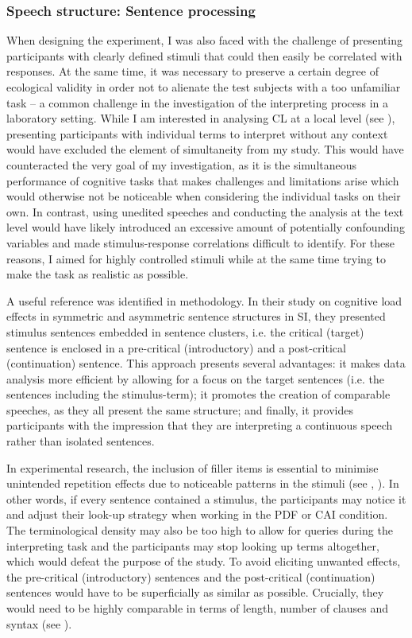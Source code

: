 \subsubsection{Speech structure: Sentence processing} \label{sentenceprocessing}
When designing the experiment, I was also faced with the challenge of presenting participants with clearly defined stimuli that could then easily be correlated with responses. At the same time, it was necessary to preserve a certain degree of ecological validity in order not to alienate the test subjects with a too unfamiliar task – a common challenge in the investigation of the interpreting process in a laboratory setting. While I am interested in analysing CL at a local level (see ), presenting participants with individual terms to interpret without any context would have excluded the element of simultaneity from my study. This would have counteracted the very goal of my investigation, as it is the simultaneous performance of cognitive tasks that makes challenges and limitations arise which would otherwise not be noticeable when considering the individual tasks on their own. In contrast, using unedited speeches and conducting the analysis at the text level would have likely introduced an excessive amount of potentially confounding variables and made stimulus-response correlations difficult to identify. For these reasons, I aimed for highly controlled stimuli while at the same time trying to make the task as realistic as possible.

A useful reference was identified in  methodology. In their study on cognitive load effects in symmetric and asymmetric sentence structures in SI, they presented stimulus sentences embedded in sentence clusters, i.e. the critical (target) sentence is enclosed in a pre-critical (introductory) and a post-critical (continuation) sentence. This approach presents several advantages: it makes data analysis more efficient by allowing for a focus on the target sentences (i.e. the sentences including the stimulus-term); it promotes the creation of comparable speeches, as they all present the same structure; and finally, it provides participants with the impression that they are interpreting a continuous speech rather than isolated sentences.

In experimental research, the inclusion of filler items is essential to minimise unintended repetition effects due to noticeable patterns in the stimuli (see \citealt[44--45]{conklin_eye-tracking_2018}, \citealt{keating_experimental_2015}). In other words, if every sentence contained a stimulus, the participants may notice it and adjust their look-up strategy when working in the PDF or CAI condition. The terminological density may also be too high to allow for queries during the interpreting task and the participants may stop looking up terms altogether, which would defeat the purpose of the study. To avoid eliciting unwanted effects, the pre-critical (introductory) sentences and the post-critical (continuation) sentences would have to be superficially as similar as possible. Crucially, they would need to be highly comparable in terms of length, number of clauses and syntax (see \citealt[16]{keating_experimental_2015}).


